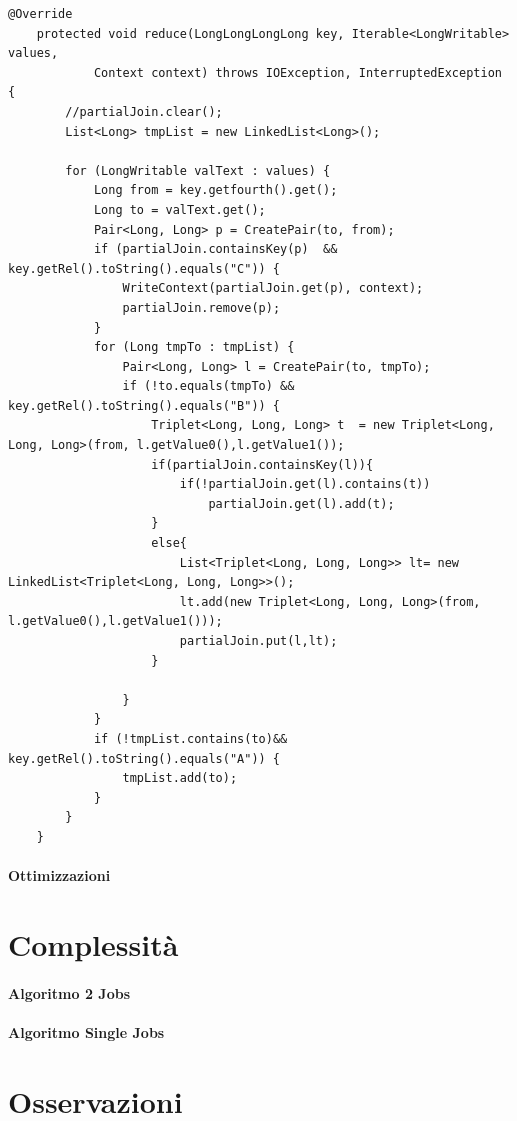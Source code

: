 \documentclass[paper=a4, fontsize=11pt]{scrartcl}	%
\numberwithin{equation}{section}															%
\numberwithin{figure}{section}																%
\numberwithin{table}{section}																%
\begin{document}
\begin{lstlisting}[label=Reducer,caption=Implementazione del Reducer single Job]
	@Override
	protected void reduce(LongLongLongLong key, Iterable<LongWritable> values,
			Context context) throws IOException, InterruptedException {
		//partialJoin.clear();
		List<Long> tmpList = new LinkedList<Long>();

		for (LongWritable valText : values) {
			Long from = key.getfourth().get();
			Long to = valText.get();
			Pair<Long, Long> p = CreatePair(to, from);
			if (partialJoin.containsKey(p)	&& key.getRel().toString().equals("C")) {
				WriteContext(partialJoin.get(p), context);
				partialJoin.remove(p);
			}
			for (Long tmpTo : tmpList) {
				Pair<Long, Long> l = CreatePair(to, tmpTo);
				if (!to.equals(tmpTo) && key.getRel().toString().equals("B")) {
					Triplet<Long, Long, Long> t  = new Triplet<Long, Long, Long>(from, l.getValue0(),l.getValue1());
					if(partialJoin.containsKey(l)){
						if(!partialJoin.get(l).contains(t))
							partialJoin.get(l).add(t);
					}
					else{
						List<Triplet<Long, Long, Long>> lt= new LinkedList<Triplet<Long, Long, Long>>();
						lt.add(new Triplet<Long, Long, Long>(from, l.getValue0(),l.getValue1()));						
						partialJoin.put(l,lt);						
					}
						
				}
			}
			if (!tmpList.contains(to)&& key.getRel().toString().equals("A")) {
				tmpList.add(to);
			}
		}
	}
\end{lstlisting}

\paragraph{Ottimizzazioni}


\section{Complessità}
\paragraph{Algoritmo 2 Jobs}
\paragraph{Algoritmo Single Jobs}


\section{Osservazioni}
\end{document}
